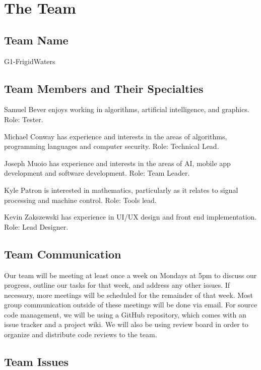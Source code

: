\documentclass{report}
\begin{document}
\newpage
\section*{\centering The Team}

\subsection*{Team Name}

G1-FrigidWaters

\subsection*{Team Members and Their Specialties}

Samuel Bever enjoys working in algorithms, artificial intelligence, and
graphics. Role: Tester.

Michael Conway has experience and interests in the areas of algorithms,
programming languages and computer security. Role: Technical Lead.

Joseph Muoio has experience and interests in the areas of AI, mobile app
development and software development. Role: Team Leader.

Kyle Patron is interested in mathematics, particularly as it relates to
signal processing and machine control. Role: Tools lead.

Kevin Zakszewski has experience in UI/UX design and front end
implementation. Role: Lead Designer.

\subsection*{Team Communication}

Our team will be meeting at least once a week on Mondays at 5pm to discuss
our progress, outline our tasks for that week, and address any other issues.
If necessary, more meetings will be scheduled for the remainder of that
week. Most group communication outside of these meetings will be done via
email. For source code management, we will be using a GitHub repository,
which comes with an issue tracker and a project wiki. We will also be using
review board in order to organize and distribute code reviews to the team.

\subsection*{Team Issues}
\end{document}
